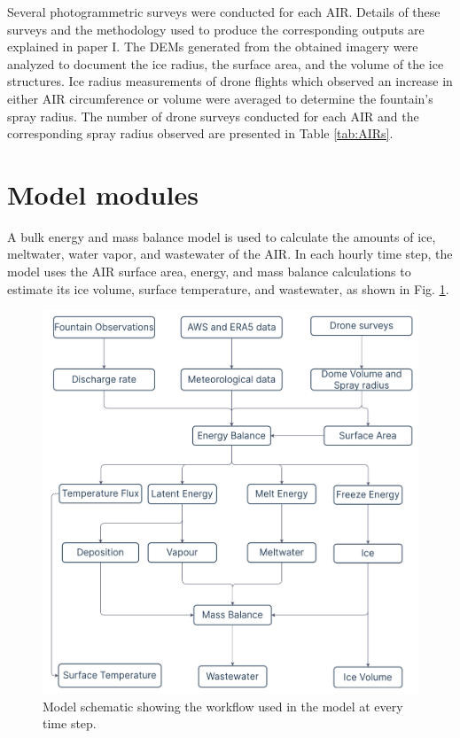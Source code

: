 Several photogrammetric surveys were conducted for each \ac{AIR}. Details of these surveys and the
methodology used to produce the corresponding outputs are explained in paper I. The
\ac{DEMs} generated from the obtained imagery were analyzed to document the ice radius, the surface area, and the
volume of the ice structures. Ice radius measurements of drone flights which observed an increase in either AIR
circumference or volume were averaged to determine the fountain's spray radius. The number of drone surveys
conducted for each AIR and the corresponding spray radius observed are presented in Table \ref{tab:AIRs}.

\section{Model modules}
\label{sec:modules}

A bulk energy and mass balance model is used to calculate the amounts of ice, meltwater, water vapor, and
wastewater of the AIR. In each hourly time step, the model uses the AIR surface area, energy, and mass balance
calculations to estimate its ice volume, surface temperature, and wastewater, as shown in Fig. \ref{fig:schema}.

\begin{figure}
	\begin{center}
		\includegraphics[width=10 cm]{figs/model_schematic.jpg}
	\end{center}
	\caption{Model schematic showing the workflow used in the model at every time step. }
	\label{fig:schema}
\end{figure}

